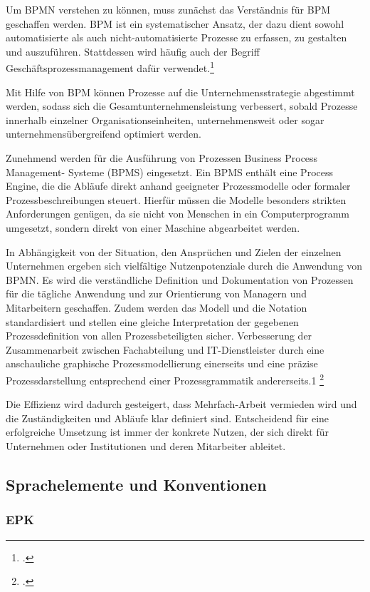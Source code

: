 Um BPMN verstehen zu können, muss zunächst das Verständnis für BPM geschaffen
werden. BPM ist ein systematischer Ansatz, der
dazu dient sowohl automatisierte als auch nicht-automatisierte
Prozesse zu erfassen, zu gestalten und auszuführen.
Stattdessen wird häufig auch der Begriff Geschäftsprozessmanagement dafür
verwendet.\footcite[S.1]{praxishandbuch:bpmn2}

Mit Hilfe von BPM können Prozesse auf die Unternehmensstrategie abgestimmt werden,
sodass sich die Gesamtunternehmensleistung verbessert, sobald Prozesse innerhalb
einzelner Organisationseinheiten, unternehmensweit oder sogar unternehmensübergreifend
optimiert werden.

Zunehmend werden für die Ausführung von Prozessen Business Process Management-
Systeme (BPMS) eingesetzt. Ein BPMS enthält eine Process Engine,
die die Abläufe direkt anhand geeigneter Prozessmodelle oder
formaler Prozessbeschreibungen steuert.
Hierfür müssen die Modelle besonders strikten Anforderungen genügen,
da sie nicht von Menschen in ein Computerprogramm umgesetzt,
sondern direkt von einer Maschine abgearbeitet werden.

In Abhängigkeit von der Situation, den Ansprüchen und Zielen der einzelnen
Unternehmen ergeben sich vielfältige Nutzenpotenziale
durch die Anwendung von BPMN. Es wird die verständliche Definition
und Dokumentation von Prozessen für die tägliche Anwendung und zur
Orientierung von Managern und Mitarbeitern geschaffen.
Zudem werden das Modell und die Notation standardisiert und stellen eine
gleiche Interpretation der gegebenen Prozessdefinition
von allen Prozessbeteiligten sicher. Verbesserung der Zusammenarbeit
zwischen Fachabteilung und IT-Dienstleister durch eine
anschauliche graphische Prozessmodellierung einerseits und eine präzise
Prozessdarstellung entsprechend einer Prozessgrammatik andererseits.1
\footcite[S.1]{allweyer}

Die Effizienz wird dadurch gesteigert, dass Mehrfach-Arbeit vermieden wird und
die Zuständigkeiten und Abläufe klar definiert sind.
Entscheidend für eine erfolgreiche Umsetzung ist immer der konkrete Nutzen,
der sich direkt für Unternehmen oder Institutionen und deren Mitarbeiter ableitet.


\subsection{Sprachelemente und Konventionen}

\subsubsection{EPK}

